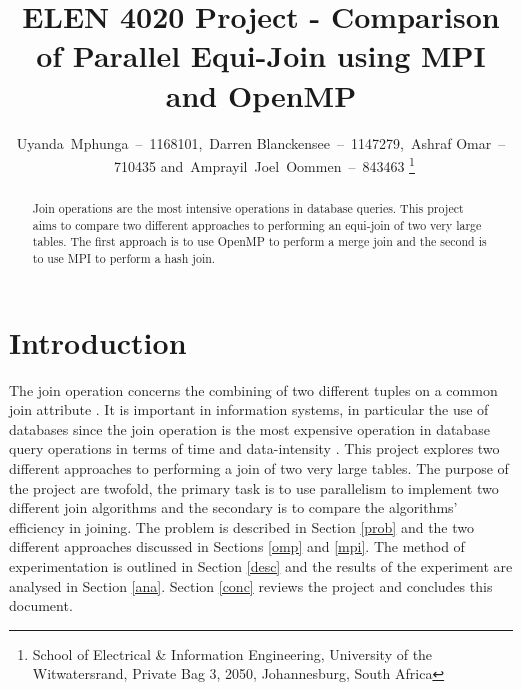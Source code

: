 \documentclass[journal,draftclsnofoot,11pt]{IEEEtran}
\begin{document}
\title{ELEN 4020 Project - Comparison of Parallel Equi-Join using MPI and OpenMP}
\author{Uyanda~Mphunga~--~1168101,~Darren Blanckensee~--~1147279,~Ashraf Omar~--~710435 and~Amprayil~Joel~Oommen~--~843463
\thanks{School of Electrical \& Information Engineering, University of the
Witwatersrand, Private Bag 3, 2050, Johannesburg, South Africa}
}
\maketitle
\pagestyle{plain}
\begin{abstract}
Join operations are the most intensive operations in database queries. This project aims to compare two different approaches to performing an equi-join of two very large tables. The first approach is to use OpenMP to perform a merge join and the second is to use MPI to perform a hash join.
\end{abstract}
\section{Introduction}
The join operation concerns the combining of two different tuples on a common join attribute \cite{Yu1998}. It is important in information systems, in particular the use of databases since the join operation is the most expensive operation in database query operations in terms of time and data-intensity \cite{Mishra1992}. This project explores two different approaches to performing a join of two very large tables. The purpose of the project are twofold, the primary task is to use parallelism to implement two different join algorithms and the secondary is to compare the algorithms’ efficiency in joining. The problem is described in Section \ref{prob} and the two different approaches discussed in Sections \ref{omp} and \ref{mpi}. The method of experimentation is outlined in Section \ref{desc} and the results of the experiment are analysed in Section \ref{ana}. Section \ref{conc} reviews the project and concludes this document.
\end{document}
